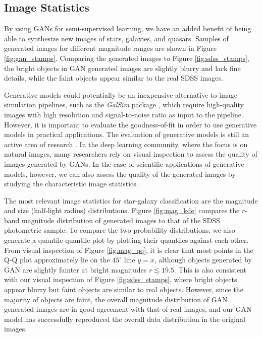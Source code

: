 \subsection{Image Statistics}
  \label{sec:image_stats}

By using GANs for semi-supervised learning, we have an added benefit of being able to synthesize
new images of stars, galaxies, and quasars.
Samples of generated images for different magnitude ranges are shown in Figure \ref{fig:gan_stamps}.
Comparing the generated images to Figure \ref{fig:sdss_stamps}, the bright objects in GAN generated images are
slightly blurry and lack fine details, while the faint objects appear similar to the real SDSS images.

Generative models could potentially be an inexpensive alternative to
image simulation pipelines, such as the \textit{GalSim} package \citep{rowe2015galsim},
which require high-quality images with high resolution and signal-to-noise ratio
as input to the pipeline.
However, it is important to evaluate the goodness-of-fit in order to use generative models
in practical applications.
The evaluation of generative models is still an active area of research \citep{theis2016note}.
In the deep learning community, where the focus is on natural images,
many researchers rely on visual inspection to assess the quality of images generated by GANs.
In the case of scientific applications of generative models, however,
we can also assess the quality of the generated images by studying the characteristic image statistics.

The most relevant image statistics for star-galaxy classification are the magnitude and size (\ie half-light radius) distributions.
Figure \ref{fig:mag_kde} compares the $r$-band magnitude distribution of generated images to that of the SDSS photometric sample.
To compare the two probability distributions, we also generate a quantile-quantile plot
\citep[Q-Q plot;][]{wilk1968probability} by plotting their quantiles against each other.
From visual inspection of Figure \ref{fig:mag_qq},
it is clear that most points in the Q-Q plot approximately lie on the $45^{\circ}$ line $y = x$,
although objects generated by GAN are slightly fainter at bright magnitudes $r \lesssim 19.5$.
This is also consistent with our visual inspection of Figure \ref{fig:sdss_stamps}, where bright objects appear blurry
but faint objects are similar to real objects.
However, since the majority of objects are faint, the overall magnitude distribution of GAN generated images are in good agreement with
that of real images,
and our GAN model has successfully reproduced the overall data distribution in the original images.

